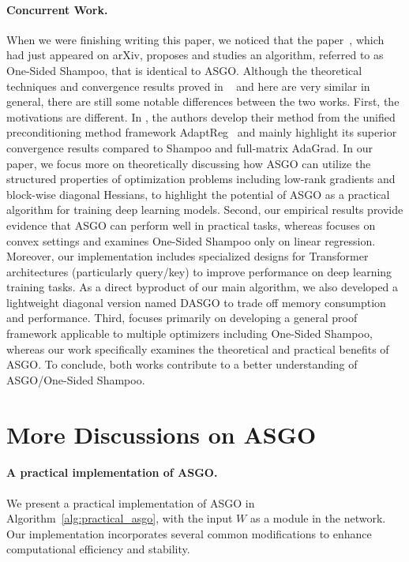 \documentclass{article}
\theoremstyle{remark}
\begin{document}
\paragraph{Concurrent Work.} When we were finishing writing this paper, we noticed that the paper~\citep{xie2025structured}, which had just appeared on arXiv, proposes and studies an algorithm, referred to as One-Sided Shampoo, that is identical to ASGO. Although the theoretical techniques and convergence results proved in ~\citep{xie2025structured} and here are very similar in general, there are still some notable differences between the two works. First, the motivations are different. In \citet{xie2025structured}, the authors develop their method from the unified preconditioning method framework AdaptReg~\citep{gupta2017unified} and mainly highlight its superior convergence results compared to Shampoo and full-matrix AdaGrad. In our paper, we focus more on theoretically discussing how ASGO can utilize the structured properties of optimization problems including low-rank gradients and block-wise diagonal Hessians, to highlight the potential of ASGO as a practical algorithm for training deep learning models. Second, our empirical results provide evidence that ASGO can perform well in practical tasks, whereas \citet{xie2025structured} focuses on convex settings and examines One-Sided Shampoo only on linear regression. Moreover, our implementation includes specialized designs for Transformer architectures (particularly query/key) to improve performance on deep learning training tasks. As a direct byproduct of our main algorithm, we also developed a lightweight diagonal version named DASGO to trade off memory consumption and performance. Third, \citet{xie2025structured} focuses primarily on developing a general proof framework applicable to multiple optimizers including One-Sided Shampoo, whereas our work specifically examines the theoretical and practical benefits of ASGO. To conclude, both works contribute to a better understanding of ASGO/One-Sided Shampoo.

\section{More Discussions on ASGO}\label{appendix:discussions}
\paragraph{A practical implementation of ASGO.} We present a practical implementation of ASGO in Algorithm~\ref{alg:practical_asgo}, with the input $W$ as a module in the network. Our implementation incorporates several common modifications to enhance computational efficiency and stability.
\end{document}
